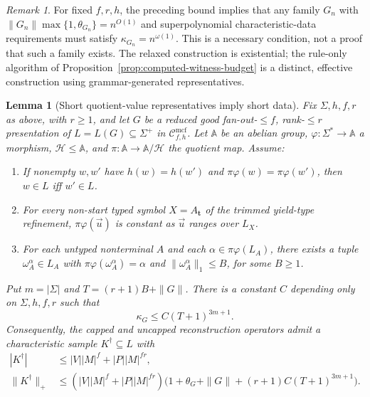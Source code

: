 \documentclass[11pt]{article}
\numberwithin{equation}{section}
\theoremstyle{plain}
\newtheorem{lemma}[theorem]{Lemma}
\theoremstyle{definition}
\theoremstyle{remark}
\newtheorem{remark}[theorem]{Remark}
\newcommand{\Cmcf}[2]{\mathcal{C}^{\mathrm{mcf}}_{#1,#2}}
\newcommand{\tuple}[1]{\vec{#1}}
\theoremstyle{plain}
\begin{document}
\begin{remark}
For fixed $f,r,h$, the preceding bound implies that
any family $G_n$ with
$\|G_n\|\max\{1,\theta_{G_n}\}=n^{O(1)}$
and superpolynomial characteristic-data requirements
must satisfy $\kappa_{G_n}=n^{\omega(1)}$.
This is a necessary condition, not a proof that such a
family exists.  The relaxed construction is existential;
the rule-only algorithm of
Proposition~\ref{prop:computed-witness-budget} is a
distinct, effective construction using grammar-generated
representatives.
\end{remark}


\begin{lemma}[Short quotient-value representatives imply short data]
\label{lem:mcfg-coset-representative-transfer}
Fix $\Sigma,h,f,r$ as above, with $r\ge1$, and let $G$ be a
reduced good fan-out-$\le f$, rank-$\le r$ presentation of
$L=L(G)\subseteq\Sigma^+$ in $\Cmcf{f}{h}$.
Let $\mathbb A$ be an abelian group, $\varphi:\Sigma^*\to\mathbb A$
a morphism, $\mathcal H\le\mathbb A$, and $\pi:\mathbb A\to
\mathbb A/\mathcal H$ the quotient map. Assume:
\begin{enumerate}[label=(\roman*),leftmargin=*]
\item If nonempty $w,w'$ have $h(w)=h(w')$ and
$\pi\varphi(w)=\pi\varphi(w')$, then $w\in L$ iff $w'\in L$.
\item For every non-start typed symbol $X=A_{\mathbf t}$ of the
trimmed yield-type refinement, $\pi\varphi(\tuple u)$ is constant
as $\tuple u$ ranges over $L_X$.
\item For each untyped nonterminal $A$ and each
$\alpha\in\pi\varphi(L_A)$, there exists a tuple
$\omega_A^\alpha\in L_A$ with
$\pi\varphi(\omega_A^\alpha)=\alpha$ and
$\|\omega_A^\alpha\|_1\le B$, for some $B\ge1$.
\end{enumerate}
Put $m=|\Sigma|$ and $T=(r+1)B+\|G\|$.
There is a constant $C$ depending only on $\Sigma,h,f,r$ such that
\[
 \kappa_G\le C(T+1)^{3m+1}.
\]
Consequently, the capped and uncapped reconstruction operators
admit a characteristic sample $K^\dagger\subseteq L$ with
\[
\begin{split}
 |K^\dagger|&\le |V||M|^f+|P||M|^{fr},\\
 \|K^\dagger\|_+
 &\le (|V||M|^f+|P||M|^{fr})
 \bigl(1+\theta_G+\|G\|+(r+1)C(T+1)^{3m+1}\bigr).
\end{split}
\]
\end{lemma}
\end{document}
